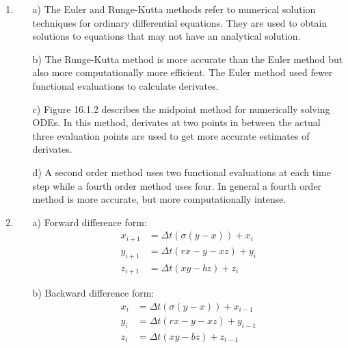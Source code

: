 \documentclass[11pt,oneside]{article}
\begin{document}
\begin{enumerate}
\item 
\begin{enumerate}
	\item[a)] The Euler and Runge-Kutta methods refer to numerical solution techniques for ordinary differential equations. They are used to obtain solutions to equations that may not have an analytical solution. 
	\item[b)] The Runge-Kutta method is more accurate than the Euler method but also more computationally more efficient.  The Euler method used fewer functional evaluations to calculate derivates. 
	\item[c)] Figure 16.1.2 describes the midpoint method for numerically solving ODEs. In this method, derivates at two points in between the actual three evaluation points are used to get more accurate estimates of derivates. 
	\item[d)] A second order method uses two functional evaluations at each time step while a fourth order method uses four. In general a fourth order method is more accurate, but more computationally intense. 
\end{enumerate}

\item
\begin{enumerate}
	\item[a)] Forward difference form:
\begin{align}
	x_{i+1}&={\Delta t}(\sigma(y-x))+x_i\\
	y_{i+1}&={\Delta t}(rx-y-xz)+y_i\\
	z_{i+1}&={\Delta t}(xy-bz)+z_i
\end{align}
	\item[b)] Backward difference form:
\begin{align}
	x_{i}&={\Delta t}(\sigma(y-x))+x_{i-1}\\
	y_{i}&={\Delta t}(rx-y-xz)+y_{i-1}\\
	z_{i}&={\Delta t}(xy-bz)+z_{i-1}
\end{align}
\end{enumerate}



\end{enumerate}
\end{document}
